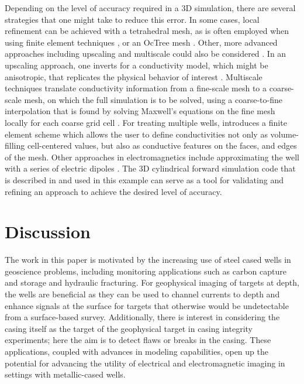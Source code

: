 \documentclass[extra,mreferee]{gji}
\begin{document}
Depending on the level of accuracy required in a 3D simulation, there are several strategies that one might take to reduce this error. In some cases, local refinement can be achieved with a tetrahedral mesh, as is often employed when using finite element techniques \citep{Weiss2016}, or an OcTree mesh \citep{Haber2007}. Other, more advanced approaches including upscaling and multiscale could also be considered \citep{Haber2014, Caudillo-Mata2017, Caudillo-Mata2017a}. In an upscaling approach, one inverts for a conductivity model, which might be anisotropic, that replicates the physical behavior of interest \citep{Caudillo-Mata2017}. Multiscale techniques translate conductivity information from a fine-scale mesh to a coarse-scale mesh, on which the full simulation is to be solved, using a coarse-to-fine interpolation that is found by solving Maxwell’s equations on the fine mesh locally for each coarse grid cell \citep{Haber2014, Caudillo-Mata2017a}. For treating multiple wells, \cite{Weiss2017} introduces a finite element scheme which allows the user to define conductivities not only as volume-filling cell-centered values, but also as conductive features on the faces, and edges of the mesh. Other approaches in electromagnetics include approximating the well with a series of electric dipoles \citep{Kohnke2017, Patzer2017}.
The 3D cylindrical forward simulation code that is described in \cite{Heagy2018a} and used in this example can serve as a tool for validating and refining an approach to achieve the desired level of accuracy.



\section{Discussion}
The work in this paper is motivated by the increasing use of steel cased wells in geoscience problems, including monitoring applications such as carbon capture and storage and hydraulic fracturing. For geophysical imaging of targets at depth, the wells are beneficial as they can be used to channel currents to depth and enhance signals at the surface for targets that otherwise would be undetectable from a surface-based survey. Additionally, there is interest in considering the casing itself as the target of the geophysical target in casing integrity experiments; here the aim is to detect flaws or breaks in the casing. These applications, coupled with advances in modeling capabilities, open up the potential for advancing the utility of electrical and electromagnetic imaging in settings with metallic-cased wells.
\end{document}
